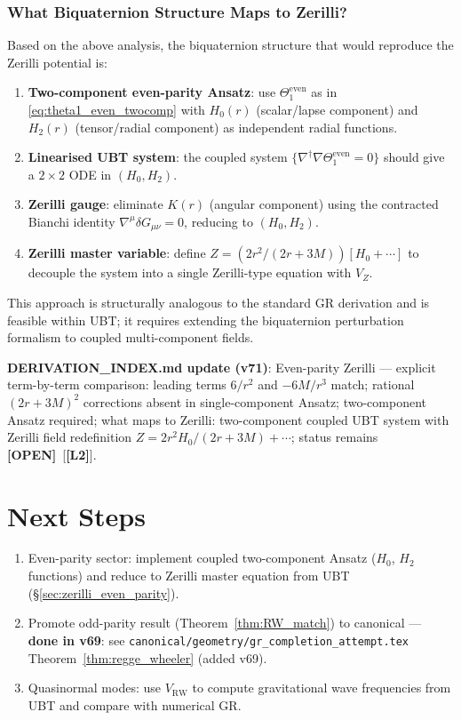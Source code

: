 \documentclass[12pt]{article}
\theoremstyle{definition}
\theoremstyle{remark}
\newcommand{\Ltwo}{\textbf{[L2]}}
\newcommand{\OPEN}{\textbf{[OPEN]}}
\begin{document}
\subsubsection{What Biquaternion Structure Maps to Zerilli?}

Based on the above analysis, the biquaternion structure that would reproduce
the Zerilli potential is:
\begin{enumerate}
  \item \textbf{Two-component even-parity Ansatz}: use
        $\Theta_1^{\text{even}}$ as in \eqref{eq:theta1_even_twocomp}
        with $H_0(r)$ (scalar/lapse component) and $H_2(r)$ (tensor/radial
        component) as independent radial functions.
  \item \textbf{Linearised UBT system}: the coupled system
        $\{\nabla^\dagger\nabla\Theta_1^{\text{even}} = 0\}$
        should give a $2 \times 2$ ODE in $(H_0, H_2)$.
  \item \textbf{Zerilli gauge}: eliminate $K(r)$ (angular component) using
        the contracted Bianchi identity $\nabla^\mu\delta G_{\mu\nu} = 0$,
        reducing to $(H_0, H_2)$.
  \item \textbf{Zerilli master variable}: define
        $Z = (2r^2/(2r+3M))[H_0 + \cdots]$ to decouple the system into
        a single Zerilli-type equation with $V_Z$.
\end{enumerate}

This approach is structurally analogous to the standard GR derivation and
is feasible within UBT; it requires extending the biquaternion perturbation
formalism to coupled multi-component fields.

\medskip
\textbf{DERIVATION\_INDEX.md update (v71)}: Even-parity Zerilli — explicit
term-by-term comparison: leading terms $6/r^2$ and $-6M/r^3$ match; rational
$(2r+3M)^2$ corrections absent in single-component Ansatz; two-component Ansatz
required; what maps to Zerilli: two-component coupled UBT system with Zerilli
field redefinition $Z = 2r^2H_0/(2r+3M)+\cdots$; status remains \OPEN\ [\Ltwo].

\section{Next Steps}
\label{sec:nextsteps}

\begin{enumerate}
  \item Even-parity sector: implement coupled two-component Ansatz
        ($H_0$, $H_2$ functions) and reduce to Zerilli master equation
        from UBT (§\ref{sec:zerilli_even_parity}).
  \item Promote odd-parity result (Theorem~\ref{thm:RW_match}) to
        canonical — \textbf{done in v69}: see
        \texttt{canonical/geometry/gr\_completion\_attempt.tex}
        Theorem~\ref{thm:regge_wheeler} (added v69).
  \item Quasinormal modes: use $V_{\text{RW}}$ to compute gravitational
        wave frequencies from UBT and compare with numerical GR.
\end{enumerate}
\end{document}
